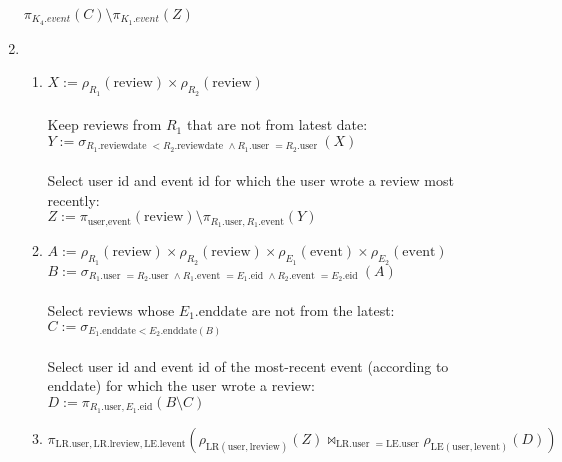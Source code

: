 \documentclass{article}
\newcommand{\GETS}{:=}
\newcommand{\rename}{\rho}
\newcommand{\select}{\sigma}
\newcommand{\rel}[1]{\text{#1}}
\newcommand{\attr}[1]{\text{#1}}
\newcommand{\ra}[2]{\rel{#1}.\attr{#2}}
\newcommand{\project}{\pi}
\newcommand{\product}{\times}
\newcommand{\difference}{\setminus}
\newcommand{\njoin}{\Join}
\begin{document}
\begin{enumerate}
        $\project_{K_4.event}(C) \difference \project_{K_1.event}(Z)$ \\
  \item
    \begin{enumerate}
      \item $X \GETS \rename_{R_1}(\rel{review}) \product
                      \rename_{R_2}(\rel{review})$ \\ \\
            Keep reviews from $R_1$ that are not from latest date: \\
            $Y \GETS \select_{R_1.\attr{reviewdate } < R_2.\attr{reviewdate }
                              \land R_1.\attr{user } = R_2.\attr{user }}(X)$ \\ \\
            Select user id and event id for which the user wrote a review most
            recently: \\
            $Z \GETS
              \project_{\attr{user}, \attr{event}}(\rel{review}) \difference
              \project_{R_1.\attr{user}, R_1.\attr{event}}(Y)$ \\
      \item $A \GETS \rename_{R_1}(\rel{review}) \product
                      \rename_{R_2}(\rel{review}) \product
                      \rename_{E_1}(\rel{event}) \product
                      \rename_{E_2}(\rel{event})$ \\
            $B \GETS \select_{R_1.\attr{user } = R_2.\attr{user } \land
                              R_1.\attr{event } = E_1.\attr{eid } \land
                              R_2.\attr{event } = E_2.\attr{eid }}(A)$ \\ \\
            Select reviews whose $E_1.\attr{enddate}$ are not from the latest: \\
            $C \GETS \select_{E_1.\attr{enddate} < E_2.\attr{enddate}(B)}$ \\ \\
            Select user id and event id of the most-recent event (according to
            enddate) for which the user wrote a review: \\
            $D \GETS \project_{R_1.\attr{user}, E_1.\attr{eid}}(B \difference C)$ \\
      \item $\project_{\ra{LR}{user}, \ra{LR}{lreview}, \ra{LE}{levent}}
              (\rename_{\rel{LR}(\rel{user}, \rel{lreview})}(Z)
                \njoin_{\ra{LR}{user } = \ra{LE}{user}}
                \rename_{\rel{LE}(\rel{user}, \rel{levent})}(D))$ \\
    \end{enumerate}

\end{enumerate}
\end{document}
